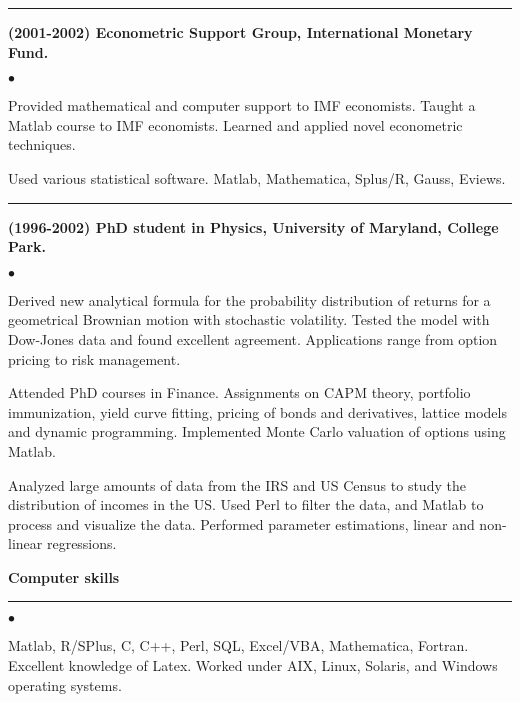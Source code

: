 \documentclass[12pt]{article}
\begin{document}
\noindent
\rule{165mm}{0.3mm}
{\bf (2001-2002) Econometric Support Group, International Monetary Fund.}
\begin{list}{$\bullet$}
   {\setlength{\itemsep}{0ex}
    \setlength{\parsep}{1ex}}
    \item Provided mathematical and computer support to IMF
    economists.  Taught a Matlab course to IMF economists.  Learned
    and applied novel econometric techniques.

    \item Used various statistical software.  Matlab, Mathematica,
    Splus/R, Gauss, Eviews.
\end{list}

\noindent
\rule{165mm}{0.3mm}
{\bf (1996-2002) PhD student in Physics, University of Maryland,
  College Park.}
\begin{list}{$\bullet$}
   {\setlength{\itemsep}{0ex}
    \setlength{\parsep}{1ex}}
    \item Derived new analytical formula for the probability distribution 
	of returns for a geometrical Brownian motion with stochastic 
	volatility. Tested the model with Dow-Jones data and found 
	excellent agreement. Applications range from option pricing to 
	risk management. 

    \item Attended PhD courses in Finance. Assignments on CAPM theory, 
	portfolio immunization, yield curve fitting, pricing of bonds 
	and derivatives, lattice models and dynamic programming. 
	Implemented Monte Carlo	valuation of options using Matlab. 

    \item Analyzed large amounts of data from the IRS and US Census to
	study the distribution of incomes in the US. Used Perl to
	filter the data, and Matlab to process and visualize the
	data. Performed parameter estimations, linear and non-linear
	regressions.

\end{list}

\large\textsf{\textbf {Computer skills}}

\vspace*{-8pt}
\noindent
\rule{165mm}{0.5mm}
\normalfont\normalsize
\vspace*{-12pt}
\begin{list}{$\bullet$}
   {\setlength{\itemsep}{0ex}
    \setlength{\parsep}{1ex}} 
    \item Matlab, R/SPlus, C, C++, Perl, SQL, Excel/VBA, Mathematica,
        Fortran.  Excellent knowledge of Latex.  Worked under AIX,
        Linux, Solaris, and Windows operating systems.
\end{list}
\end{document}
